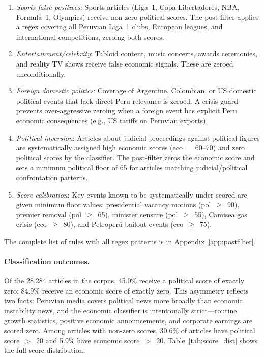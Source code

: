 \documentclass[12pt,a4paper]{article}
\begin{document}
\begin{enumerate}
  \item \emph{Sports false positives}: Sports articles (Liga~1, Copa
    Libertadores, NBA, Formula~1, Olympics) receive non-zero political
    scores. The post-filter applies a regex covering all
    Peruvian Liga~1 clubs, European leagues, and international competitions,
    zeroing both scores.

  \item \emph{Entertainment/celebrity}: Tabloid content, music concerts,
    awards ceremonies, and reality TV shows receive false economic signals.
    These are zeroed unconditionally.

  \item \emph{Foreign domestic politics}: Coverage of Argentine, Colombian,
    or US domestic political events that lack direct Peru relevance is
    zeroed. A crisis guard prevents over-aggressive zeroing when a foreign
    event has explicit Peru economic consequences (e.g., US tariffs on
    Peruvian exports).

  \item \emph{Political inversion}: Articles about judicial proceedings
    against political figures are systematically assigned high economic
    scores (eco~=~60--70) and zero political scores by the classifier. The
    post-filter zeros the economic score and sets a minimum political floor
    of 65 for articles matching judicial/political confrontation patterns.

  \item \emph{Score calibration}: Key events known to be systematically
    under-scored are given minimum floor values: presidential vacancy
    motions (pol~$\geq$~90), premier removal (pol~$\geq$~65), minister
    censure (pol~$\geq$~55), Camisea gas crisis (eco~$\geq$~80), and
    Petroper\'u bailout events (eco~$\geq$~75).
\end{enumerate}

The complete list of rules with all regex patterns is in
Appendix~\ref{app:postfilter}.

\paragraph{Classification outcomes.}
Of the 28,284 articles in the corpus, 45.0\% receive a political score of
exactly zero; 84.9\% receive an economic score of exactly zero.  This
asymmetry reflects two facts: Peruvian media covers political news more
broadly than economic instability news, and the economic classifier is
intentionally strict---routine growth statistics, positive economic
announcements, and corporate earnings are scored zero.  Among articles
with non-zero scores, 30.6\% of articles have political score~$>$~20 and
5.9\% have economic score~$>$~20.  Table~\ref{tab:score_dist} shows the
full score distribution.
\end{document}
